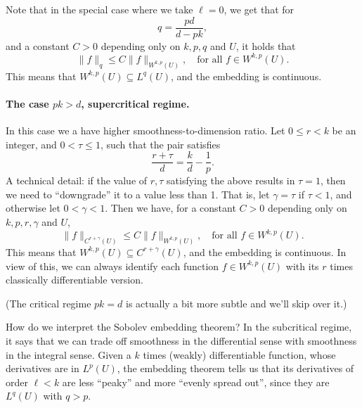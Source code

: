 \documentclass{article}
\begin{document}
Note that in the special case where we take $\ell = 0$, we get that for  
\[
q = \frac{pd}{d-pk},
\]
and a constant $C>0$ depending only on $k,p,q$ and $U$, it holds that 
\[
\|f\|_q \leq C \|f\|_{W^{k,p}(U)}, \quad \text{for all $f \in W^{k,p}(U)$}. 
\]
This means that $W^{k,p}(U) \subseteq L^q(U)$, and the embedding is continuous.  



\paragraph{The case $pk > d$, supercritical regime.}

In this case we a have higher smoothness-to-dimension ratio. Let $0 \leq r < k$
be an integer, and $0 < \tau \leq 1$, such that the pair satisfies 
\[
\frac{r+\tau}{d} = \frac{k}{d} - \frac{1}{p}.
\]
A technical detail: if the value of $r,\tau$ satisfying the above results in
$\tau = 1$, then we need to ``downgrade'' it to a value less than 1. That is,
let $\gamma = \tau$ if $\tau < 1$, and otherwise let $0 < \gamma < 1$. Then we
have, for a constant $C>0$ depending only on $k,p,r,\gamma$ and $U$,       
\[
\|f\|_{C^{r+\gamma}(U)} \leq C \|f\|_{W^{k,p}(U)}, \quad \text{for all $f \in
  W^{k,p}(U)$}. 
\]
This means that $W^{k,p}(U) \subseteq C^{r+\gamma}(U)$, and the embedding is
continuous. In view of this, we can always identify each function $f \in
W^{k,p}(U)$ with its $r$ times classically differentiable version.     



\medskip
(The critical regime $pk = d$ is actually a bit more subtle and we'll skip over
it.)  

How do we interpret the Sobolev embedding theorem? In the subcritical regime, it
says that we can trade off smoothness in the differential sense with smoothness
in the integral sense. Given a $k$ times (weakly) differentiable function, whose
derivatives are in $L^p(U)$, the embedding theorem tells us that its derivatives
of order $\ell < k$ are less ``peaky'' and more ``evenly spread out'', since
they are $L^q(U)$ with $q > p$.
\end{document}

